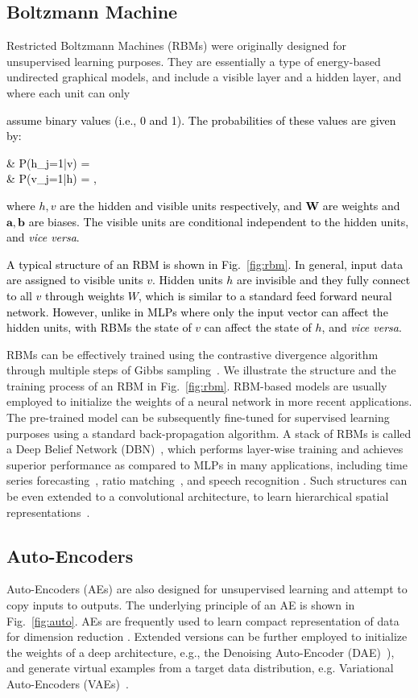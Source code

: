 \documentclass[journal,comsoc,letter]{IEEEtran}
\newcommand{\edit}[1]{\textcolor{black}{#1}}
\newcommand{\rev}[1]{\textcolor{black}{#1}}
\begin{document}
\subsection{Boltzmann Machine}
Restricted Boltzmann Machines (RBMs) \cite{le2008representational} were originally designed for unsupervised learning purposes. They are essentially a type of energy-based undirected graphical models, and include a visible layer and a hidden layer, and where each unit can only \edit{assume binary values (i.e., 0 and 1).
The probabilities of these values are given by:
\begin{flalign*}
& P(h_j=1|v) = \frac{1}{1+e^{-\mathbf{W\cdot v + b_j}}}\\
& P(v_j=1|h) = \frac{1}{1+e^{-\mathbf{W^T\cdot h + a_j}}},
\end{flalign*}
where $h, v$ are the hidden and visible units respectively, and $\mathbf{W}$ are weights and $\mathbf{a}, \mathbf{b}$ are biases. The visible units are conditional independent to the hidden units, and \emph{vice versa}. 
} \rev{A typical structure of an RBM is shown in Fig.~\ref{fig:rbm}. In general, input data are assigned to visible units $v$. Hidden units $h$ are invisible and they fully connect to all $v$ through weights $W$, which is similar to a standard feed forward neural network. However, unlike in MLPs where only the input vector can affect the hidden units, with RBMs the state of $v$ can affect the state of $h$, and \emph{vice versa}.}

RBMs can be effectively trained using the contrastive divergence algorithm~\cite{hinton2002training} through multiple steps of Gibbs sampling~\cite{casella1992explaining}. We illustrate the structure and the training process of an RBM in Fig.~\ref{fig:rbm}. RBM-based models are usually employed to initialize the weights of a neural network in more recent applications. The pre-trained model can be subsequently fine-tuned for supervised learning purposes using a standard back-propagation algorithm. A stack of RBMs is called a Deep Belief Network (DBN)~\cite{hinton2006fast}, which performs layer-wise training and achieves superior performance as compared to MLPs in many applications, including time series forecasting~\cite{kuremoto2014forecast}, ratio matching~\cite{dauphin2013stochastic}, and speech recognition \cite{sainath2011making}. Such structures can be even extended to a convolutional architecture, to learn hierarchical spatial representations~\cite{lee2009convolutional}.

\subsection{Auto-Encoders}
Auto-Encoders (AEs) are also designed for unsupervised learning and attempt to copy inputs to outputs. The underlying principle of an AE is shown in Fig.~\ref{fig:auto}. AEs are frequently used to learn compact representation of data for dimension reduction \cite{bengio2009learning}. Extended versions can be further employed to initialize the weights of a deep architecture, e.g., the Denoising Auto-Encoder (DAE)~\cite{vincent2010stacked}), and generate virtual examples from a target data distribution, e.g. Variational Auto-Encoders (VAEs)~\cite{kingma2014auto}. 
\end{document}
